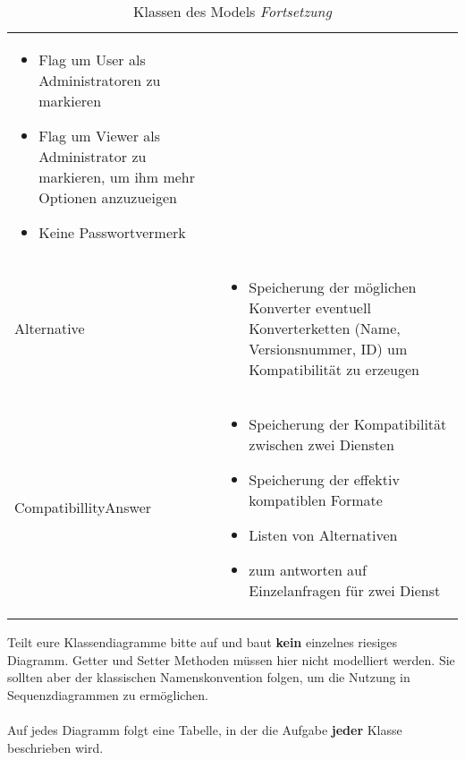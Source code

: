 \begin{table}
\begin{tabularx}{\textwidth}{p{} | X}
\begin{itemize}
			\item Flag um User als Administratoren zu markieren
			\item Flag um Viewer als Administrator zu markieren, um ihm mehr Optionen anzuzueigen
			\item Keine Passwortvermerk
		\end{itemize}\\
		Alternative & \begin{itemize}
			\item Speicherung der möglichen Konverter eventuell Konverterketten (Name, Versionsnummer, ID) um Kompatibilität zu erzeugen
		\end{itemize}\\
		\rowcolor[HTML]{E7E7E7}
		CompatibillityAnswer & \begin{itemize}
			\item Speicherung der Kompatibilität zwischen zwei Diensten
			\item Speicherung der effektiv kompatiblen Formate
			\item Listen von Alternativen
			\item zum antworten auf Einzelanfragen für zwei Dienst
		\end{itemize}\\
	\end{tabularx}
	\caption{Klassen des Models \textit{Fortsetzung}}
\end{table}

\begin{tcolorbox}
Teilt eure Klassendiagramme bitte auf und baut \textbf{kein} einzelnes riesiges Diagramm.
Getter und Setter Methoden müssen hier nicht modelliert werden.
Sie sollten aber der klassischen Namenskonvention folgen, um die Nutzung in Sequenzdiagrammen zu ermöglichen.
\\\\
Auf jedes Diagramm folgt eine Tabelle, in der die Aufgabe \textbf{jeder} Klasse beschrieben wird.
\end{tcolorbox}
